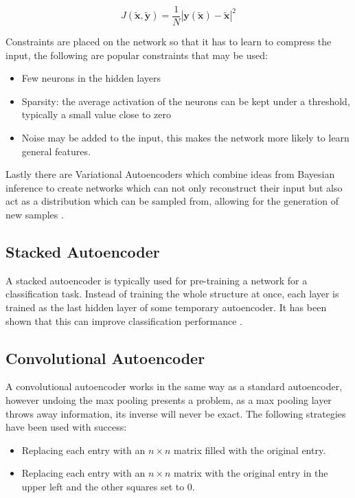 \documentclass[11pt,twoside]{report}
\begin{document}
\begin{equation}
    J(\tilde{\mathbf{x}},\tilde{\mathbf{y}}) = \frac{1}{N}\left |\mathbf{y}(\tilde{\mathbf{x}})-\tilde{\mathbf{x}}\right | ^2
\end{equation}

Constraints are
placed on the network so that it has to learn to compress the input, the following
are popular constraints that may be used:
\begin{itemize}
    \item Few neurons in the hidden layers
    \item Sparsity: the average activation of the neurons can be kept under a
    threshold, typically a small value close to zero \cite{autong}
    \item Noise may be added to the input, this makes the network more likely
    to learn general features.
\end{itemize}
Lastly there are Variational Autoencoders which combine ideas from Bayesian inference
to create networks which can not only reconstruct their input but also act as a
distribution which can be sampled from, allowing for the generation of new samples \cite{Kingma2013}.

\subsection{Stacked Autoencoder}

A stacked autoencoder is typically used for pre-training a network for a classification task.
Instead of training the whole structure at once, each layer is trained as the last hidden
layer of some temporary autoencoder. It has been shown that this can improve classification performance \cite{stacks}.


\subsection{Convolutional Autoencoder}
A convolutional autoencoder works in the same way as a standard autoencoder, however
undoing the max pooling presents a problem, as a max pooling layer throws away
information, its inverse will never be exact. The following strategies have been
used with success:
\begin{itemize}
    \item Replacing each entry with an $n \times n$ matrix filled with the original
    entry.
    \item Replacing each entry with an  $n\times n$  matrix with
    the original entry in the upper left and the other squares set to 0. \cite{Dosovitskiy2015}
\end{itemize}
\end{document}
